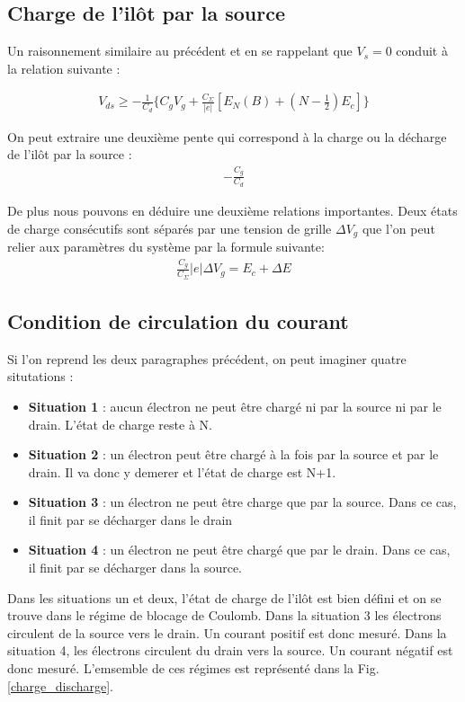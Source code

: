 \subsection{Charge de l'il\^ot par la source}
Un raisonnement similaire au précédent et en se rappelant que $V_s = 0$ conduit à la relation suivante :

\begin{eqnarray}
V_{ds} \geq -\frac{1}{C_d} \{C_gV_g + \frac{C_{\Sigma}}{|e|}[E_N(B) + (N-\frac{1}{2})E_c] \}
\end{eqnarray}


On peut extraire une deuxième pente qui correspond à la charge ou la décharge de l'il\^ot par la source :
\begin{eqnarray}
-\frac{C_g}{C_d} \nonumber
\end{eqnarray}


De plus nous pouvons en déduire une deuxième relations importantes. Deux états de charge consécutifs sont séparés par une tension de grille $\Delta V_g$ que l'on peut relier aux paramètres du système par la formule suivante:
\begin{eqnarray}
\frac{C_g}{C_{\Sigma}} |e| \Delta V_g = E_c + \Delta E
\end{eqnarray}

\subsection{Condition de circulation du courant}

Si l'on reprend les deux paragraphes précédent, on peut imaginer quatre situtations :
\begin{itemize}
\item \textbf{Situation 1} : aucun électron ne peut \^etre chargé ni par la source ni par le drain. L'état de charge reste à N.
\item \textbf{Situation 2} : un électron peut \^etre chargé à la fois par la source et par le drain. Il va donc y demerer et l'état de charge est N+1.
\item \textbf{Situation 3} : un électron ne peut \^etre charge que par la source. Dans ce cas, il finit par se décharger dans le drain
\item \textbf{Situation 4} : un électron ne peut \^etre chargé que par le drain. Dans ce cas, il finit par se décharger dans la source. \newline
\end{itemize}

Dans les situations un et deux, l'état de charge de l'il\^ot est bien défini et on se trouve dans le régime de blocage de Coulomb. Dans la situation 3 les électrons circulent de la source vers le drain. Un courant positif est donc mesuré. Dans la situation 4, les électrons circulent du drain vers la source. Un courant négatif est donc mesuré. L'emsemble de ces régimes est représenté dans la Fig. \ref{charge_discharge}.

